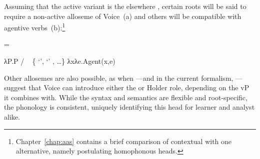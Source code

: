 \begin{exe}
\begin{xlist}
\begin{exe}
\begin{xlist}
\begin{exe}
\begin{xlist}
\begin{exe}
\begin{exe}
\begin{xlist}
\begin{exe}
\begin{xlist}
\begin{exe}
\begin{xlist}
\begin{exe}
\begin{xlist}
\begin{exe}
\begin{xlist}
\begin{exe}
\begin{xlist}
\begin{exe}
\begin{xlist}
\begin{exe}
\begin{xlist}
\begin{exe}
\begin{xlist}
\begin{exe}
\begin{xlist}
\begin{exe}
\begin{xlist}
\begin{exe}
\begin{xlist}
\begin{exe}
\begin{exe}
\begin{xlist}
\begin{exe}
\begin{xlist}
\begin{exe}
\begin{xlist}
\begin{exe}
\begin{xlist}
{Assuming that the active variant is the elsewhere , certain roots will be said to require a non-active alloseme of Voice~(\nextx a) and others will be compatible with agentive verbs~(\nextx b):\footnote{Chapter~\ref{chap:aas} contains a brief comparison of contextual  with one alternative, namely postulating homophonous heads.}
 \begin{exe}
 \ex  {} =  
 \begin{xlist} 
 	\ex  λP.P \phantom{agent(x,e)xxx} / \trace~ \{  `',  `' , \dots \} 
 	\ex  λxλe.Agent(x,e) 
 \z
\z 

Other allosemes are also possible, as when \cite{kratzer96}---and in the current formalism, \cite{woodmarantz17}---suggest that Voice can introduce either the  or Holder role, depending on the vP it combines with. While the syntax and semantics are flexible and root-specific, the phonology is consistent, uniquely identifying this head for learner and analyst alike.
		

\end{xlist}
\end{exe}}
\end{xlist}
\end{exe}
\end{xlist}
\end{exe}
\end{xlist}
\end{exe}
\end{xlist}
\end{exe}
\end{exe}
\end{xlist}
\end{exe}
\end{xlist}
\end{exe}
\end{xlist}
\end{exe}
\end{xlist}
\end{exe}
\end{xlist}
\end{exe}
\end{xlist}
\end{exe}
\end{xlist}
\end{exe}
\end{xlist}
\end{exe}
\end{xlist}
\end{exe}
\end{xlist}
\end{exe}
\end{xlist}
\end{exe}
\end{xlist}
\end{exe}
\end{exe}
\end{xlist}
\end{exe}
\end{xlist}
\end{exe}
\end{xlist}
\end{exe}
